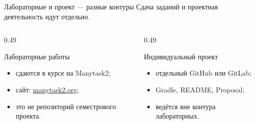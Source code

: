 \begin{frame}{Лабораторные и проект --- разные контуры}
   Сдача заданий и проектная деятельность идут отдельно.

  \medskip
  \begin{columns}[T]
    \begin{column}{0.49\textwidth}
      \begin{block}{Лабораторные работы}
        \begin{itemize}
          \item сдаются в курсе на Manytask2;
          \item сайт: \href{https://manytask2.org}{manytask2.org};
          \item это не репозиторий семестрового проекта.
        \end{itemize}
      \end{block}
    \end{column}
    \begin{column}{0.49\textwidth}
      \begin{block}{Индивидуальный проект}
        \begin{itemize}
          \item отдельный GitHub или GitLab;
          \item Gradle, README, Proposal;
          \item ведётся вне контура лабораторных.
        \end{itemize}
      \end{block}
    \end{column}
  \end{columns}
\end{frame}
